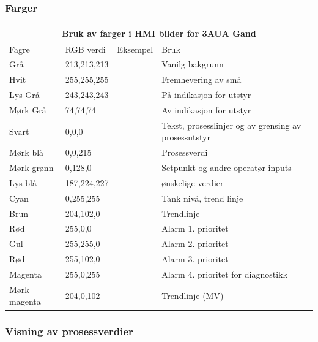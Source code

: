 \subsubsection{Farger}
\begin{center}
\begin{tabular}{ | m{2.2cm} | m{2cm} |m{1.8cm} |m{5cm} |} 
\hline
	\multicolumn{4}{|c|}{\textbf{\cellcolor[HTML]{D5D5D5}Bruk av farger i HMI bilder for 3AUA Gand}} \\
\hline
	Fagre	&RGB verdi&Eksempel&Bruk\\
\hline
	Grå &213,213,213&{\cellcolor[HTML]{D5D5D5}}&Vanilg bakgrunn\\
\hline
	Hvit &255,255,255&{\cellcolor[HTML]{FFFFFF}}&Fremhevering av små\\
\hline
	Lys Grå &243,243,243&{\cellcolor[HTML]{F3F3F3}}&På indikasjon for utstyr\\
\hline
	Mørk Grå &74,74,74&{\cellcolor[HTML]{4A4A4A}}&Av indikasjon for utstyr\\
\hline
	Svart &0,0,0&{\cellcolor[HTML]{000000}}&\tiny Tekst, prosesslinjer og av grensing av prosessutstyr\normalsize\\
\hline
	Mørk blå &0,0,215&{\cellcolor[HTML]{0000D7}}&Prosessverdi\\
\hline
	Mørk grønn &0,128,0&{\cellcolor[HTML]{008000}}&\small Setpunkt og andre operatør inputs\normalsize\\
\hline
	Lys blå &187,224,227&{\cellcolor[HTML]{BBE0E3}}&ønskelige verdier\\
\hline
	Cyan &0,255,255&{\cellcolor[HTML]{00FFFF}}&Tank nivå, trend linje\\
\hline
	Brun &204,102,0&{\cellcolor[HTML]{CC6600}}&Trendlinje\\
\hline
	Rød &255,0,0&{\cellcolor[HTML]{FF0000}}&Alarm 1. prioritet\\
\hline
	Gul &255,255,0&{\cellcolor[HTML]{FFFF00}}&Alarm 2. prioritet\\
\hline
	Rød &255,102,0&{\cellcolor[HTML]{FF6600}}&Alarm 3. prioritet\\
\hline
	Magenta&255,0,255&{\cellcolor[HTML]{FF00FF}}&\small Alarm 4. prioritet for diagnostikk\\
\hline
	\small Mørk magenta&204,0,102&{\cellcolor[HTML]{E00066}}&\normalsize Trendlinje (MV)\\

\hline
\end{tabular}
\end{center}
\subsubsection{Visning av prosessverdier}

